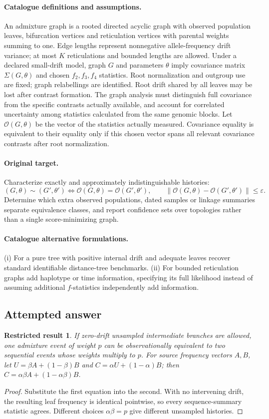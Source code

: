 \documentclass[11pt]{article}
\newtheorem{attemptresult}{Restricted result}[section]
\begin{document}
\paragraph{Catalogue definitions and assumptions.}
An admixture graph is a rooted directed acyclic graph with observed population leaves, bifurcation vertices and reticulation vertices with parental weights summing to one. Edge lengths represent nonnegative allele-frequency drift variance; at most $K$ reticulations and bounded lengths are allowed. Under a declared small-drift model, graph $G$ and parameters $\theta$ imply covariance matrix $\Sigma(G,\theta)$ and chosen $f_2,f_3,f_4$ statistics. Root normalization and outgroup use are fixed; graph relabellings are identified. Root drift shared by all leaves may be lost after contrast formation. The graph analysis must distinguish full covariance from the specific contrasts actually available, and account for correlated uncertainty among statistics calculated from the same genomic blocks. Let $\mathcal O(G,\theta)$ be the vector of the statistics actually measured. Covariance equality is equivalent to their equality only if this chosen vector spans all relevant covariance contrasts after root normalization.
\paragraph{Original target.}
Characterize exactly and approximately indistinguishable histories:
\[
 (G,\theta)\sim(G',\theta')
 \iff\mathcal O(G,\theta)=\mathcal O(G',\theta'),
 \qquad
 \|\mathcal O(G,\theta)-\mathcal O(G',\theta')\|\le\varepsilon.
\]
Determine which extra observed populations, dated samples or linkage summaries separate equivalence classes, and report confidence sets over topologies rather than a single score-minimizing graph.
\paragraph{Catalogue alternative formulations.}
(i) For a pure tree with positive internal drift and adequate leaves recover standard identifiable distance-tree benchmarks. (ii) For bounded reticulation graphs add haplotype or time information, specifying its full likelihood instead of assuming additional $f$-statistics independently add information.
\subsection{Attempted answer}
\begin{attemptresult}
If zero-drift unsampled intermediate branches are allowed, one admixture event of weight $p$ can be observationally equivalent to two sequential events whose weights multiply to $p$. For source frequency vectors $A,B$, let $U=\beta A+(1-\beta)B$ and $C=\alpha U+(1-\alpha)B$; then $C=\alpha\beta A+(1-\alpha\beta)B$.
\end{attemptresult}
\begin{proof}
Substitute the first equation into the second. With no intervening drift, the resulting leaf frequency is identical pointwise, so every sequence-summary statistic agrees. Different choices $\alpha\beta=p$ give different unsampled histories.
\end{proof}
\end{document}
